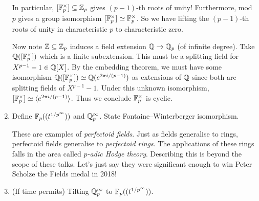 \documentclass{article}
\begin{document}
\begin{enumerate}
  In particular, $[\mathbb{F}_p^\times] \subseteq \mathbb{Z}_p$ gives
  $(p-1)$-th roots of unity!
  Furthermore, mod $p$ gives a group isomorphism 
  $[\mathbb{F}_p^\times] \simeq \mathbb{F}_p^\times$.
  So we have lifting the $(p-1)$-th roots of unity in characteristic $p$
  to characteristic zero.
  
  Now note $\mathbb{Z} \subseteq \mathbb{Z}_p$ induces a field extension 
  $\mathbb{Q} \to \mathbb{Q}_p$ (of infinite degree).
  Take $\mathbb{Q}([\mathbb{F}_p^\times])$ which is a finite subextension.
  This must be a splitting field for $X^{p-1} - 1 \in \mathbb{Q}[X]$.
  By the embedding theorem,
  we must have some isomorphism
  $\mathbb{Q}([\mathbb{F}_p^\times]) \simeq \mathbb{Q}(e^{2 \pi i / (p-1)})$
  as extensions of $\mathbb{Q}$ since both are splitting fields of $X^{p-1} - 1$.
  Under this unknown isomorphism,
  $[\mathbb{F}_p^\times] \simeq \langle e^{2\pi i / (p-1)}\rangle$.
  Thus we conclude $\mathbb{F}_p^\times$ is cyclic.

  \item Define $\mathbb{F}_p((t^{1 / p^\infty}))$ and $\mathbb{Q}_p^\infty$.
  State Fontaine--Winterberger isomorphism.
  \cite{FW83}

  These are examples of \emph{perfectoid fields}.
  Just as fields generalise to rings,
  perfectoid fields generalise to \emph{perfectoid rings}.
  The applications of these rings falls in
  the area called \emph{$p$-adic Hodge theory}.
  Describing this is beyond the scope of these talks.
  Let's just say they were significant enough to win Peter Scholze
  the Fields medal in 2018!

  \item (If time permits) 
  Tilting $\mathbb{Q}_p^\infty$ to $\mathbb{F}_p((t^{1 / p^\infty}))$.

\end{enumerate}



\printbibliography
\end{document}
